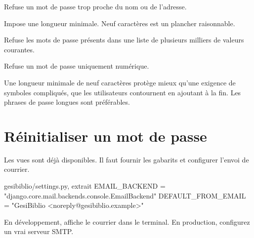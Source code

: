 \begin{description}[leftmargin=5.4cm,style=nextline]
  \item[\code{UserAttributeSimilarityValidator}] Refuse un mot de passe trop proche
  du nom ou de l'adresse.
  \item[\code{MinimumLengthValidator}] Impose une longueur minimale. Neuf
  caractères est un plancher raisonnable.
  \item[\code{CommonPasswordValidator}] Refuse les mots de passe présents dans une
  liste de plusieurs milliers de valeurs courantes.
  \item[\code{NumericPasswordValidator}] Refuse un mot de passe uniquement
  numérique.
\end{description}

\begin{note}
Une longueur minimale de neuf caractères protège mieux qu'une exigence de symboles
compliqués, que les utilisateurs contournent en ajoutant \code{!} à la fin. Les
phrases de passe longues sont préférables.
\end{note}

\section{Réinitialiser un mot de passe}

Les vues sont déjà disponibles. Il faut fournir les gabarits et configurer l'envoi
de courrier.

\begin{codebox}[python]{gesibiblio/settings.py, extrait}
EMAIL_BACKEND = "django.core.mail.backends.console.EmailBackend"
DEFAULT_FROM_EMAIL = "GesiBiblio <noreply@gesibiblio.example>"
\end{codebox}

En développement,  affiche le courrier dans le terminal.
En production, configurez un vrai serveur SMTP.


